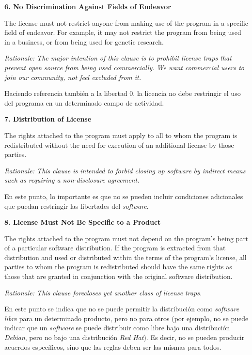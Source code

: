 {\bf 6. No Discrimination Against Fields of Endeavor

The license must not restrict anyone from making use of the program in a
specific field of endeavor. For example, it may not restrict the program from
being used in a business, or from being used for genetic research.}

\textit{Rationale: The major intention of this clause is to prohibit license
traps that prevent open source from being used commercially. We want commercial
users to join our community, not feel excluded from it.}\newline

Haciendo referencia también a la libertad 0, la licencia no debe restringir el
uso del programa en un determinado campo de actividad.\newline

{\bf 7. Distribution of License

The rights attached to the program must apply to all to whom the program is
redistributed without the need for execution of an additional license by those
parties.}

\textit{Rationale: This clause is intended to forbid closing up software by
indirect means such as requiring a non-disclosure agreement.}\newline

En este punto, lo importante es que no se pueden incluir condiciones adicionales
que puedan restringir las libertades del \textit{software}.\newline

{\bf 8. License Must Not Be Specific to a Product

The rights attached to the program must not depend on the program's being part
of a particular software distribution. If the program is extracted from that
distribution and used or distributed within the terms of the program's license,
all parties to whom the program is redistributed should have the same rights as
those that are granted in conjunction with the original software distribution.}

\textit{Rationale: This clause forecloses yet another class of license
traps.}\newline

En este punto se indica que no se puede permitir la distribución como
\textit{software libre} para un determinado producto, pero no para otros (por
ejemplo, no se puede indicar que un \textit{software} se puede distribuir como
libre bajo una distribución \textit{Debian}, pero no bajo una distribución
\textit{Red Hat}). Es decir, no se pueden producir acuerdos específicos, sino
que las reglas deben ser las mismas para todos.\newline


